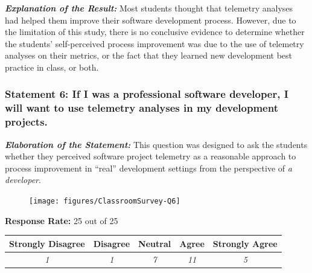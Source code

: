 \textbf{\textit{Explanation of the Result:}}
Most students thought that telemetry analyses had helped them improve their software development process. However, due to the limitation of this study, there is no conclusive evidence to determine whether the students' self-perceived process improvement was due to the use of telemetry analyses on their metrics, or the fact that they learned new development best practice in class, or both.



\clearpage
\subsubsection{Statement 6: If I was a professional software developer, I will want to use telemetry analyses in my development projects.}

\textbf{\textit{Elaboration of the Statement:}}
This question was designed to ask the students whether they perceived software project telemetry as a reasonable approach to process improvement in ``real'' development settings from the perspective of \textit{a developer}. 

\begin{quote}\end{quote} %

\begin{figure}[h]
  \center
  \texttt{[image: figures/ClassroomSurvey-Q6]}
  \label{fig:InClassSurvey-Q6}
\end{figure}

\begin{center}\textbf{Response Rate:} 25 out of 25\end{center}
\begin{table}[h]
	\centering
		\begin{tabular}{|c|c|c|c|c|} 
			\hline
			\textbf{Strongly Disagree} & \textbf{Disagree} & \textbf{Neutral} & \textbf{Agree} & \textbf{Strongly Agree} \\
			\hline
			\textit{1} & \textit{1} & \textit{7} & \textit{11} &\textit{5} \\
			\hline
		\end{tabular}
	\label{table:InClassSurvey-Q6}
\end{table}

